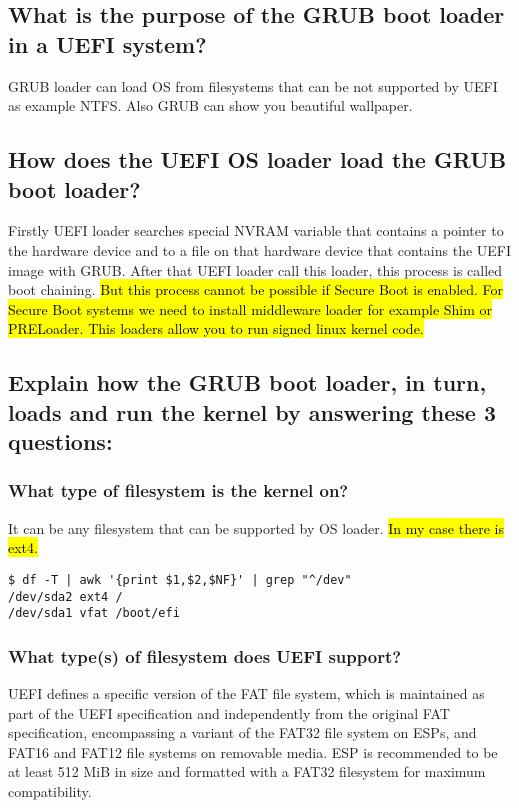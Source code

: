 \documentclass[a4paper,11pt]{article}
\theoremstyle{mytheor}
\begin{document}
\subsection{What is the purpose of the GRUB boot loader in a UEFI system?}
GRUB loader can load OS from filesystems that can be not supported by UEFI as example NTFS. Also GRUB can show you beautiful wallpaper. 

\subsection{How does the UEFI OS loader load the GRUB boot loader?}
Firstly UEFI loader searches special NVRAM variable that contains a pointer to the hardware device and to a file on that hardware device that contains the UEFI image with GRUB. After that UEFI loader call this loader, this process is called boot chaining. \hl{But this process cannot be possible if Secure Boot is enabled. For Secure Boot systems we need to install middleware loader for example Shim or PRELoader. This loaders allow you to run signed linux kernel code.}

\subsection{Explain how the GRUB boot loader, in turn, loads and run the kernel by answering these 3 questions:}

\subsubsection{What type of filesystem is the kernel on?}
It can be any filesystem that can be supported by OS loader. \hl{In my case there is ext4.}

\begin{lstlisting}
$ df -T | awk '{print $1,$2,$NF}' | grep "^/dev"
/dev/sda2 ext4 /
/dev/sda1 vfat /boot/efi
\end{lstlisting}

\subsubsection{What type(s) of filesystem does UEFI support?}
UEFI defines a specific version of the FAT file system, which is maintained as part of the UEFI specification and independently from the original FAT specification, encompassing a variant of the FAT32 file system on ESPs, and FAT16 and FAT12 file systems on removable media. ESP is recommended to be at least 512 MiB in size and formatted with a FAT32 filesystem for maximum compatibility.
\end{document}
